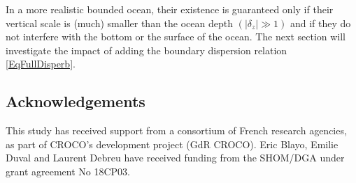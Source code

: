 \documentclass[a4paper,11pt]{article}
\begin{document}

In a more realistic bounded ocean, their existence is guaranteed only if their vertical scale is (much) smaller than the ocean depth $(|\delta_z| \gg 1)$ and if they do not interfere with the bottom or the surface of the ocean. The next section will investigate the impact of adding the boundary dispersion relation \ref{EqFullDisperb}.



\subsection*{Acknowledgements}
This study has received support from a consortium of French research agencies, as part of CROCO's development project (GdR CROCO).
Eric Blayo, Emilie Duval and Laurent Debreu have received funding from the SHOM/DGA under grant agreement No 18CP03.




\end{document}
